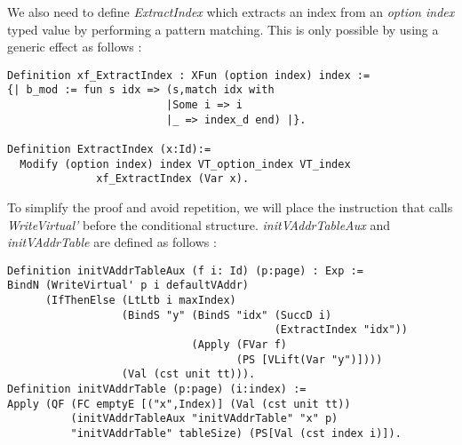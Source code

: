 We also need to define \textit{ExtractIndex} which extracts an index from an \textit{option index} typed value by performing a pattern matching. This is only possible by using a generic effect as follows : 
\begin{lstlisting}[caption = {ExtractIndex definition}, xleftmargin=-.01\textwidth,
xrightmargin=-.01\textwidth,mathescape=true]
Definition xf_ExtractIndex : XFun (option index) index := 
{| b_mod := fun s idx => (s,match idx with 
	                     |Some i => i 
	                     |_ => index_d end) |}.
	                     
Definition ExtractIndex (x:Id):= 
  Modify (option index) index VT_option_index VT_index 
              xf_ExtractIndex (Var x).
\end{lstlisting} \vspace{4pt}
To simplify the proof and avoid repetition, we will place the instruction that calls \textit{WriteVirtual'} before the conditional structure. \textit{initVAddrTableAux} and \textit{initVAddrTable} are defined as follows : \pagebreak
\begin{lstlisting}[caption = {initVAddrTable definition in the deep embedding}, xleftmargin=-.06\textwidth,
xrightmargin=-.06\textwidth,mathescape=true]
Definition initVAddrTableAux (f i: Id) (p:page) : Exp :=
BindN (WriteVirtual' p i defaultVAddr)
      (IfThenElse (LtLtb i maxIndex)
                  (BindS "y" (BindS "idx" (SuccD i) 
                                          (ExtractIndex "idx"))
                             (Apply (FVar f) 
                                    (PS [VLift(Var "y")])))
                  (Val (cst unit tt))). 
Definition initVAddrTable (p:page) (i:index) := 
Apply (QF (FC emptyE [("x",Index)] (Val (cst unit tt)) 
          (initVAddrTableAux "initVAddrTable" "x" p) 
          "initVAddrTable" tableSize) (PS[Val (cst index i)]). 
\end{lstlisting}	\vspace{4pt}

